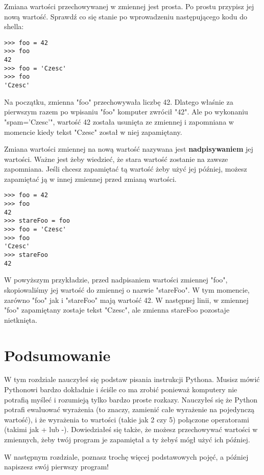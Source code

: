 \documentclass{book}
\begin{document}
Zmiana wartości przechowywanej w zmiennej jest prosta. Po prostu przypisz jej nową wartość. Sprawdź co się stanie po wprowadzeniu następującego kodu do shella:

\begin{lstlisting}
>>> foo = 42
>>> foo
42
>>> foo = 'Czesc'
>>> foo
'Czesc'
\end{lstlisting}

Na początku, zmienna "foo" przechowywała liczbę 42. Dlatego właśnie za pierwszym razem po wpisaniu "foo" komputer zwrócił "42". Ale po wykonaniu "spam='Czesc'", wartość 42 została usunięta ze zmiennej i zapomniana w momencie kiedy tekst "Czesc" został w niej zapamiętany.

Zmiana wartości zmiennej na nową wartość nazywana jest {\bf nadpisywaniem} jej wartości. Ważne jest żeby wiedzieć, że stara wartość zostanie na zawsze zapomniana. Jeśli chcesz zapamiętać tą wartość żeby użyć jej później, możesz zapamiętać ją w innej zmiennej przed zmianą wartości.

\begin{lstlisting}
>>> foo = 42
>>> foo
42
>>> stareFoo = foo
>>> foo = 'Czesc'
>>> foo
'Czesc'
>>> stareFoo
42
\end{lstlisting}

W powyższym przykładzie, przed nadpisaniem wartości zmiennej "foo", skopiowaliśmy jej wartość do zmiennej o nazwie "stareFoo". W tym momencie, zarówno "foo" jak i "stareFoo" mają wartość 42. W następnej linii, w zmiennej "foo" zapamiętany zostaje tekst "Czesc", ale zmienna stareFoo pozostaje nietknięta.

\section{Podsumowanie}

W tym rozdziale nauczyłeś się podstaw pisania instrukcji Pythona. Musisz mówić Pythonowi bardzo dokładnie i ściśle co ma zrobić ponieważ komputery nie potrafią myśleć i rozumieją tylko bardzo proste rozkazy. Nauczyłeś się że Python potrafi ewaluować wyrażenia (to znaczy, zamienić całe wyrażenie na pojedynczą wartość), i że wyrażenia to wartości (takie jak 2 czy 5) połączone operatorami (takimi jak + lub -). Dowiedziałeś się także, że możesz przechowywać wartości w zmiennych, żeby twój program je zapamiętał a ty żebyś mógł użyć ich później.

W następnym rozdziale, poznasz trochę więcej podstawowych pojęć, a później napiszesz swój pierwszy program!
\end{document}
